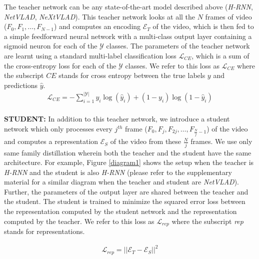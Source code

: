 \documentclass[10pt,twocolumn,letterpaper]{article}
\begin{document}
 The teacher network can be any state-of-the-art model described above (\textit{H-RNN}, \textit{NetVLAD}, \textit{NeXtVLAD}). This teacher network looks at all the $N$ frames of video ($F_{0}, F_{1},\dots,F_{N-1}$) and computes an encoding $\mathcal{E}_{T}$ of the video, which is then fed to a simple feedforward neural network with a multi-class output layer containing a sigmoid neuron for each of the $\mathscr{Y}$ classes.
The parameters of the teacher network are learnt using  a standard multi-label classification loss $\mathcal{L}_{CE}$, which is a sum of the cross-entropy loss for each of the $\mathscr{Y}$ classes. We refer to this loss as $\mathcal{L}_{CE}$ where the subscript $CE$ stands for cross entropy between the true labels $y$ and predictions $\hat{y}$.
\begin{eqnarray}
\mathcal{L}_{CE} = - \sum_{i=1}^{|\mathscr{Y}|} y_{i} \log(\hat{y}_{i}) + (1- y_{i}) \log(1- \hat{y}_{i})\label{eq1}
\end{eqnarray}
\\
\noindent \textbf{STUDENT:}
In addition to this teacher network, we introduce a student network which only processes every $j^{th}$  frame ($F_0, F_j, F_{2j}, \dots, F_{\frac{N}{j}-1} $) of the video and computes a representation $\mathcal{E}_S$ of the video from these $\frac{N}{j}$ frames. We use only same family distillation wherein both the teacher and the student have the same architecture. For example, Figure \ref{diagram1} shows the setup when the teacher is \textit{H-RNN} and the student is also \textit{H-RNN} (please refer to the supplementary material for a similar diagram when the teacher and student are \textit{NetVLAD}). Further, the parameters of the output layer are shared between the teacher and the student. The student is trained to minimize the squared error loss between the representation computed by the student network and the representation computed by the teacher. We refer to this loss as $\mathcal{L}_{rep}$ where the subscript \textit{rep} stands for representations. 

\begin{eqnarray}
 \mathcal{L}_{rep} = || \mathcal{E}_{T} - \mathcal{E}_{S} ||^{2}\label{eq2}
\end{eqnarray}
\end{document}
